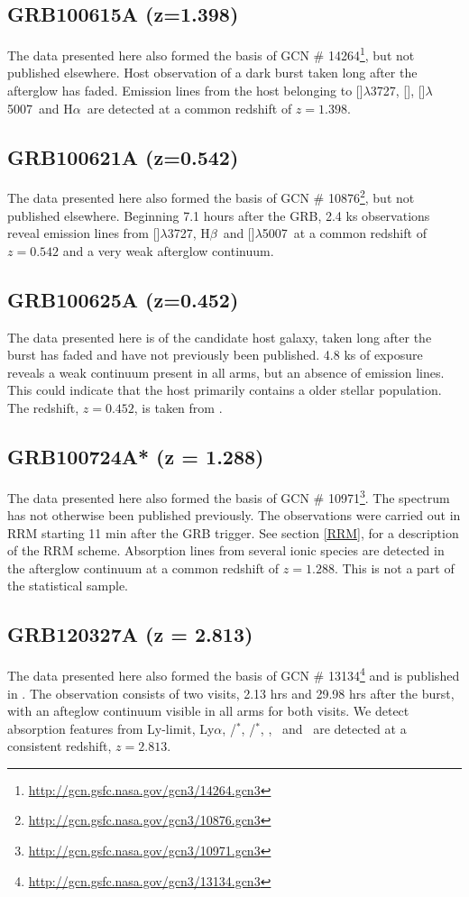 \documentclass[iop, twocolappendix, numberedappendix, tighten, appendixfloats]{emulateapj}
\newcommand{\lya}{Ly$\alpha$}
\newcommand{\hb}{H$\beta$}
\newcommand{\ha}{H$\alpha$}
\newcommand{\oii}{[\ion{O}{2}]$\lambda$3727}
\newcommand{\oiii}{[\ion{O}{3}]$\lambda$5007}
\newcommand{\neiii}{[\ion{Ne}{3}]}
\newcommand{\feii}{\ion{Fe}{2}}
\newcommand{\cii}{\ion{C}{2}}
\newcommand{\mgii}{\ion{Mg}{2}}
\newcommand{\ali}{\ion{Al}{1}}
\newcommand{\SIii}{\ion{Si}{2}}
\begin{document}
	\subsection{GRB100615A (z=1.398)}
	The data presented here also formed the basis of GCN \#
	14264\footnote{\url{http://gcn.gsfc.nasa.gov/gcn3/14264.gcn3}}, but not
	published elsewhere. Host observation of a dark burst\citep{DElia2011} taken
	long after the afterglow has faded. Emission lines from the host belonging to
	\oii, \neiii, \oiii~and \ha~are detected at a common redshift of $z=1.398$.
	
	\subsection{GRB100621A (z=0.542)}
	The data presented here also formed the basis of GCN \#
	10876\footnote{\url{http://gcn.gsfc.nasa.gov/gcn3/10876.gcn3}}, but not
	published elsewhere. Beginning 7.1 hours after the GRB, 2.4 ks observations
	reveal emission lines from \oii, \hb~and \oiii~at a common redshift of
	$z=0.542$ and a very weak afterglow continuum.

	\subsection{GRB100625A (z=0.452)}
	The data presented here is of the candidate host galaxy, taken long after the
	burst has faded and have not previously been published. 4.8 ks of exposure
	reveals a weak continuum present in all arms, but an absence of emission lines.
	This could indicate that the host primarily contains a older stellar
	population. The redshift, $z=0.452$, is taken from \citet{Fong2013}.

	
	\subsection{GRB100724A* (z = 1.288)}
	The data presented here also formed the basis of GCN \#
	10971\footnote{\url{http://gcn.gsfc.nasa.gov/gcn3/10971.gcn3}}. The spectrum
	has not otherwise been published previously. The observations were carried out
	in RRM starting 11 min after the GRB trigger. See section \ref{RRM}, for a
	description of the RRM scheme. Absorption lines from several ionic species are
	detected in the afterglow continuum at a common redshift of $z = 1.288$. This
	is not a part of the statistical sample.

	\subsection{GRB120327A (z = 2.813)}
	The data presented here also formed the basis of GCN \#
	13134\footnote{\url{http://gcn.gsfc.nasa.gov/gcn3/13134.gcn3}} and is published
	in \citet{DElia2014}. The observation consists of two visits, 2.13 hrs and
	29.98 hrs after the burst, with an afteglow continuum visible in all arms for
	both visits. We detect absorption features from Ly-limit, \lya, \cii/\cii$^*$,
	\SIii/\SIii$^*$, \ali, \feii ~and \mgii ~are detected at a consistent redshift,
	$z = 2.813$.
\end{document}
